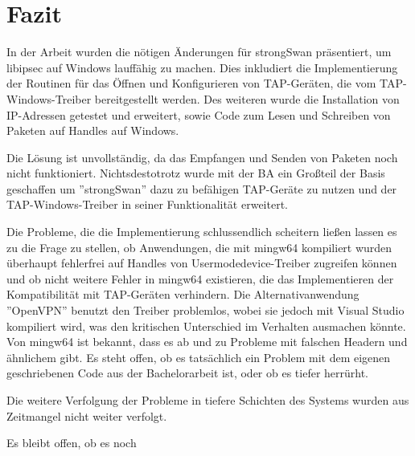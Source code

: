 



\section{Fazit}

In der Arbeit wurden die nötigen Änderungen für strongSwan präsentiert, um
libipsec auf Windows lauffähig zu machen. Dies inkludiert die Implementierung
der Routinen für das Öffnen und Konfigurieren von TAP-Geräten, die vom TAP-Windows-Treiber
bereitgestellt werden. Des weiteren wurde die Installation von IP-Adressen getestet
und erweitert, sowie Code zum Lesen und Schreiben von Paketen auf Handles auf Windows.

Die Lösung ist unvollständig, da das Empfangen und Senden von Paketen noch nicht funktioniert.
Nichtsdestotrotz wurde mit der \ac{BA} ein Großteil der Basis geschaffen um ''strongSwan''
dazu zu befähigen TAP-Geräte zu nutzen und der TAP-Windows-Treiber in seiner Funktionalität
erweitert.

Die Probleme, die die Implementierung schlussendlich scheitern ließen lassen es zu
die Frage zu stellen, ob Anwendungen, die mit mingw64 kompiliert wurden überhaupt
fehlerfrei auf Handles von Usermodedevice-Treiber zugreifen können und ob
nicht weitere Fehler in mingw64 existieren, die das Implementieren der Kompatibilität
mit TAP-Geräten verhindern. Die Alternativanwendung ''OpenVPN'' benutzt den
Treiber problemlos, wobei sie jedoch mit Visual Studio kompiliert wird,
was den kritischen Unterschied im Verhalten ausmachen könnte.
Von mingw64 ist bekannt, dass es ab und zu Probleme mit falschen Headern und ähnlichem
gibt. Es steht offen, ob es tatsächlich ein Problem mit dem eigenen geschriebenen Code
aus der Bachelorarbeit ist, oder ob es tiefer herrürht.

Die weitere Verfolgung der Probleme in tiefere Schichten des Systems wurden aus
Zeitmangel nicht weiter verfolgt.

Es bleibt offen, ob es noch 
